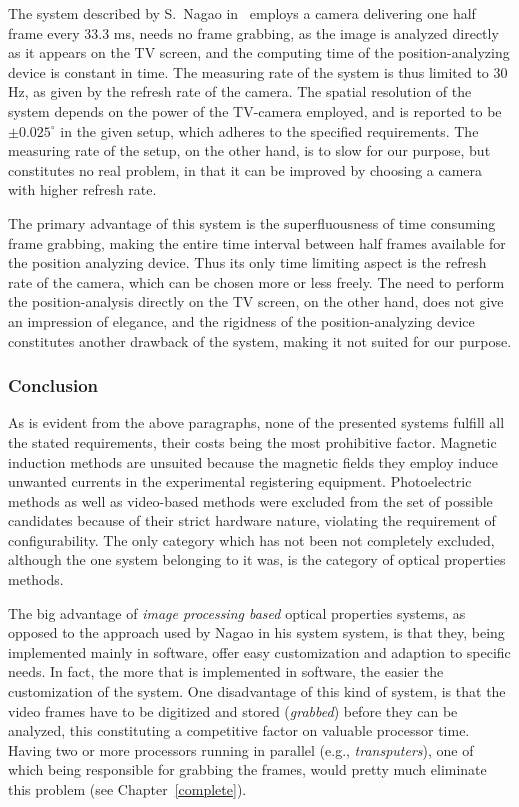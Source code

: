 The system described by S.\ Nagao in~\cite{tv} employs a camera
delivering one half frame every 33.3 ms, needs no frame grabbing, as
the image is analyzed directly as it appears on the TV screen, and the
computing time of the position-analyzing device is constant in time.
The measuring rate of the system is thus limited to 30 Hz, as given by
the refresh rate of the camera.  The spatial resolution of the system
depends on the power of the TV-camera employed, and is reported to be
$\pm 0.025^{\circ}$ in the given setup, which adheres to the specified
requirements.  The measuring rate of the setup, on the other hand, is
to slow for our purpose, but constitutes no real problem, in that it
can be improved by choosing a camera with higher refresh rate.

The primary advantage of this system is the superfluousness of time
consuming frame grabbing, making the entire time interval between half
frames available for the position analyzing device.  Thus its only
time limiting aspect is the refresh rate of the camera, which can be
chosen more or less freely.  The need to perform the position-analysis
directly on the TV screen, on the other hand, does not give an
impression of elegance, and the rigidness of the position-analyzing
device constitutes another drawback of the system, making it not
suited for our purpose.

\subsubsection{Conclusion}

As is evident from the above paragraphs, none of the presented systems
fulfill all the stated requirements, their costs being the most
prohibitive factor.  Magnetic induction methods are unsuited because
the magnetic fields they employ induce unwanted currents in the
experimental registering equipment.  Photoelectric methods as well as
video-based methods were excluded from the set of possible candidates
because of their strict hardware nature, violating the requirement of
configurability.  The only category which has not been not completely
excluded, although the one system belonging to it was, is the category
of optical properties methods.

The big advantage of {\em image processing based\/} optical properties
systems, as opposed to the approach used by Nagao in his system
system, is that they, being implemented mainly in software, offer easy
customization and adaption to specific needs.  In fact, the more that
is implemented in software, the easier the customization of the
system.  One disadvantage of this kind of system, is that the video
frames have to be digitized and stored ({\em grabbed\/}) before they
can be analyzed, this constituting a competitive factor on valuable
processor time.  Having two or more processors running in parallel
(e.g., {\em transputers\/}), one of which being responsible for
grabbing the frames, would pretty much eliminate this problem (see
Chapter~\ref{complete}).

